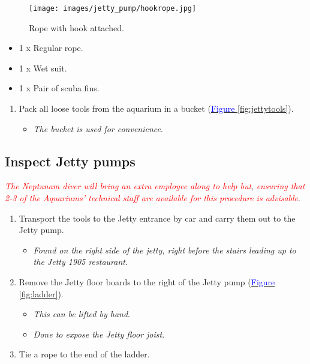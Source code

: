 \documentclass[
  12pt,
]{report}
\providecommand{\tightlist}{%
  \setlength{\itemsep}{0pt}\setlength{\parskip}{0pt}}\usepackage{longtable,booktabs,array}
\begin{document}
\begin{figure}[H]

{\centering \texttt{[image: images/jetty\_pump/hookrope.jpg]}

}

\caption{Rope with hook attached.}

\end{figure}

\begin{itemize}
\tightlist
\item
  1 x Regular rope.
\item
  1 x Wet suit.
\item
  1 x Pair of scuba fins.
\end{itemize}

\begin{enumerate}
\def\labelenumi{\arabic{enumi}.}
\tightlist
\item
  Pack all loose tools from the aquarium in a bucket
  (\ul{\textcolor{blue}{Figure \ref{fig:jettytools}}}).

  \begin{itemize}
  \tightlist
  \item
    \emph{The bucket is used for convenience}.
  \end{itemize}
\end{enumerate}

\hypertarget{inspect-jetty-pumps}{%
\subsection{\texorpdfstring{Inspect Jetty pumps
\label{inspect-jpumps}}{Inspect Jetty pumps }}\label{inspect-jetty-pumps}}

\emph{\textcolor{red}{The Neptunam diver will bring an extra employee along to help but}},
\emph{\textcolor{red}{ensuring that 2-3 of the Aquariums' technical staff are available for this procedure is advisable}}.

\begin{enumerate}
\def\labelenumi{\arabic{enumi}.}
\setcounter{enumi}{1}
\tightlist
\item
  Transport the tools to the Jetty entrance by car and carry them out to
  the Jetty pump.

  \begin{itemize}
  \tightlist
  \item
    \emph{Found on the right side of the jetty, right before the stairs
    leading up to the Jetty 1905 restaurant}.
  \end{itemize}
\item
  Remove the Jetty floor boards to the right of the Jetty pump
  (\ul{\textcolor{blue}{Figure \ref{fig:ladder}}}).

  \begin{itemize}
  \tightlist
  \item
    \emph{This can be lifted by hand}.
  \item
    \emph{Done to expose the Jetty floor joist}.
  \end{itemize}
\item
  Tie a rope to the end of the ladder.
\end{enumerate}
\end{document}
